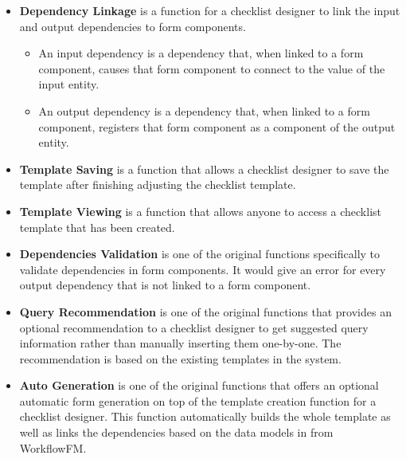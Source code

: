 \begin{itemize}
    \item \textbf{Dependency Linkage} is a function for a checklist designer to link the input and output dependencies to form components.
    \begin{itemize}
        \item An input dependency is a dependency that, when linked to a form component, causes that form component to connect to the value of the input entity.
        \item An output dependency is a dependency that, when linked to a form component, registers that form component as a component of the output entity.
    \end{itemize}
    \item \textbf{Template Saving} is a function that allows a checklist designer to save the template after finishing adjusting the checklist template.
    \item \textbf{Template Viewing} is a function that allows anyone to access a checklist template that has been created.
    \item \textbf{Dependencies Validation} is one of the original functions specifically to validate dependencies in form components. It would give an error for every output dependency that is not linked to a form component.
    \item \textbf{Query Recommendation} is one of the original functions that provides an optional recommendation to a checklist designer to get suggested query information rather than manually inserting them one-by-one. The recommendation is based on the existing templates in the system.
    \item \textbf{Auto Generation} is one of the original functions that offers an optional automatic form generation on top of the template creation function for a checklist designer. This function automatically builds the whole template as well as links the dependencies based on the data models in from WorkflowFM.
\end{itemize}

